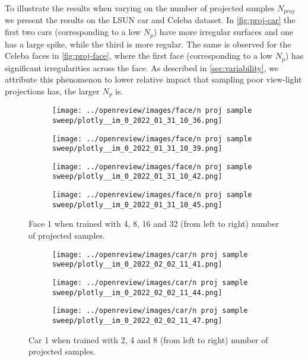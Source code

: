 To illustrate the results when varying on the number of projected samples $N_{proj}$ we present the results on the LSUN car and Celeba dataset. In \autoref{fig:proj-car} the first two cars (corresponding to a low $N_p$) have more irregular surfaces and one has a large spike, while the third is more regular. The same is observed for the Celeba faces in \autoref{fig:proj-face}, where the first face (corresponding to a low $N_p$) has significant irregularities across the face. As described in \autoref{sec:variability}, we attribute this phenomenon to lower relative impact that sampling poor view-light projections has, the larger $N_p$ is. 
\begin{figure}[htb!]
    \centering
    \begin{subfigure}{0.24\textwidth}
        \centering
        \texttt{[image: ../openreview/images/face/n proj sample sweep/plotly\_\_im\_0\_2022\_01\_31\_10\_36.png]}
    \end{subfigure}
    \begin{subfigure}{0.24\textwidth}
        \centering
        \texttt{[image: ../openreview/images/face/n proj sample sweep/plotly\_\_im\_0\_2022\_01\_31\_10\_39.png]}
    \end{subfigure}
    \begin{subfigure}{0.24\textwidth}
        \centering
        \texttt{[image: ../openreview/images/face/n proj sample sweep/plotly\_\_im\_0\_2022\_01\_31\_10\_42.png]}
    \end{subfigure}
    \begin{subfigure}{0.24\textwidth}
        \centering
        \texttt{[image: ../openreview/images/face/n proj sample sweep/plotly\_\_im\_0\_2022\_01\_31\_10\_45.png]}
    \end{subfigure}
    \caption{Face 1 when trained with 4, 8, 16 and 32 (from left to right) number of projected samples.}
    \label{fig:proj-face}
\end{figure}


\begin{figure}[htb!]
    \centering
    \begin{subfigure}{0.32\textwidth}
        \centering
        \texttt{[image: ../openreview/images/car/n proj sample sweep/plotly\_\_im\_0\_2022\_02\_02\_11\_41.png]}
    \end{subfigure}
    \begin{subfigure}{0.32\textwidth}
        \centering
        \texttt{[image: ../openreview/images/car/n proj sample sweep/plotly\_\_im\_0\_2022\_02\_02\_11\_44.png]}
    \end{subfigure}
    \begin{subfigure}{0.32\textwidth}
        \centering
        \texttt{[image: ../openreview/images/car/n proj sample sweep/plotly\_\_im\_0\_2022\_02\_02\_11\_47.png]}
    \end{subfigure}
    \caption{Car 1 when trained with 2, 4 and 8 (from left to right) number of projected samples.}
    \label{fig:proj-car}
\end{figure}
